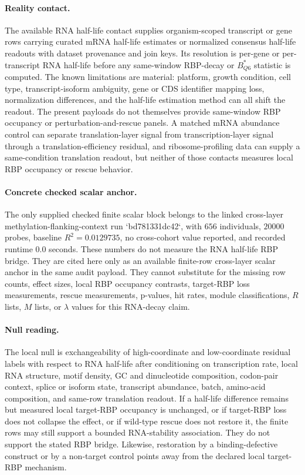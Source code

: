 \paragraph{Reality contact.}
The available RNA half-life contact supplies organism-scoped transcript or gene rows carrying curated mRNA half-life estimates or normalized consensus half-life readouts with dataset provenance and join keys.  Its resolution is per-gene or per-transcript RNA half-life before any same-window RBP-decay or $B^*_{Q6}$ statistic is computed.  The known limitations are material: platform, growth condition, cell type, transcript-isoform ambiguity, gene or CDS identifier mapping loss, normalization differences, and the half-life estimation method can all shift the readout.  The present payloads do not themselves provide same-window RBP occupancy or perturbation-and-rescue panels.  A matched mRNA abundance control can separate translation-layer signal from transcription-layer signal through a translation-efficiency residual, and ribosome-profiling data can supply a same-condition translation readout, but neither of those contacts measures local RBP occupancy or rescue behavior.

\paragraph{Concrete checked scalar anchor.}
The only supplied checked finite scalar block belongs to the linked cross-layer methylation-flanking-context run `bd781331dc42`, with $656$ individuals, $20000$ probes, baseline $R^2 = 0.0129735$, no cross-cohort value reported, and recorded runtime $0.0$ seconds.  These numbers do not measure the RNA half-life RBP bridge.  They are cited here only as an available finite-row cross-layer scalar anchor in the same audit payload.  They cannot substitute for the missing row counts, effect sizes, local RBP occupancy contrasts, target-RBP loss measurements, rescue measurements, p-values, hit rates, module classifications, $R$ lists, $M$ lists, or $\lambda$ values for this RNA-decay claim.

\paragraph{Null reading.}
The local null is exchangeability of high-coordinate and low-coordinate residual labels with respect to RNA half-life after conditioning on transcription rate, local RNA structure, motif density, GC and dinucleotide composition, codon-pair context, splice or isoform state, transcript abundance, batch, amino-acid composition, and same-row translation readout.  If a half-life difference remains but measured local target-RBP occupancy is unchanged, or if target-RBP loss does not collapse the effect, or if wild-type rescue does not restore it, the finite rows may still support a bounded RNA-stability association.  They do not support the stated RBP bridge.  Likewise, restoration by a binding-defective construct or by a non-target control points away from the declared local target-RBP mechanism.


